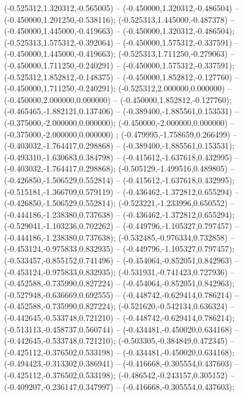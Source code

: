  (-0.525312,1.320312,-0.565005) -- (-0.450000,1.320312,-0.486504) -- (-0.450000,1.201250,-0.538116);
 (-0.525313,1.445000,-0.487378) -- (-0.450000,1.445000,-0.419663) -- (-0.450000,1.320312,-0.486504);
 (-0.525313,1.575312,-0.392064) -- (-0.450000,1.575312,-0.337591) -- (-0.450000,1.445000,-0.419663);
 (-0.525313,1.711250,-0.279063) -- (-0.450000,1.711250,-0.240291) -- (-0.450000,1.575312,-0.337591);
 (-0.525312,1.852812,-0.148375) -- (-0.450000,1.852812,-0.127760) -- (-0.450000,1.711250,-0.240291);
 (-0.525312,2.000000,0.000000) -- (-0.450000,2.000000,0.000000) -- (-0.450000,1.852812,-0.127760);
 (-0.465465,-1.882121,0.137406) -- (-0.389400,-1.885561,0.153531) -- (-0.375000,-2.000000,0.000000);
 (-0.450000,-2.000000,0.000000) -- (-0.375000,-2.000000,0.000000) ;
 (-0.479995,-1.758659,0.266499) -- (-0.403032,-1.764417,0.298868) -- (-0.389400,-1.885561,0.153531);
 (-0.493310,-1.630683,0.384798) -- (-0.415612,-1.637618,0.432995) -- (-0.403032,-1.764417,0.298868);
 (-0.505129,-1.499516,0.489805) -- (-0.426850,-1.506529,0.552814) -- (-0.415612,-1.637618,0.432995);
 (-0.515181,-1.366709,0.579119) -- (-0.436462,-1.372812,0.655294) -- (-0.426850,-1.506529,0.552814);
 (-0.523221,-1.233996,0.650552) -- (-0.444186,-1.238380,0.737638) -- (-0.436462,-1.372812,0.655294);
 (-0.529041,-1.103236,0.702262) -- (-0.449796,-1.105327,0.797457) -- (-0.444186,-1.238380,0.737638);
 (-0.532485,-0.976334,0.732858) -- (-0.453124,-0.975833,0.832935) -- (-0.449796,-1.105327,0.797457);
 (-0.533457,-0.855152,0.741496) -- (-0.454064,-0.852051,0.842963) -- (-0.453124,-0.975833,0.832935);
 (-0.531931,-0.741423,0.727936) -- (-0.452588,-0.735990,0.827224) -- (-0.454064,-0.852051,0.842963);
 (-0.527948,-0.636669,0.692555) -- (-0.448742,-0.629414,0.786214) -- (-0.452588,-0.735990,0.827224);
 (-0.521620,-0.542134,0.636324) -- (-0.442645,-0.533748,0.721210) -- (-0.448742,-0.629414,0.786214);
 (-0.513113,-0.458737,0.560744) -- (-0.434481,-0.450020,0.634168) -- (-0.442645,-0.533748,0.721210);
 (-0.503305,-0.384849,0.472345) -- (-0.425112,-0.376502,0.533198) -- (-0.434481,-0.450020,0.634168);
 (-0.494423,-0.313302,0.386941) -- (-0.416668,-0.305554,0.437603) -- (-0.425112,-0.376502,0.533198);
 (-0.486542,-0.243157,0.305152) -- (-0.409207,-0.236147,0.347997) -- (-0.416668,-0.305554,0.437603);
